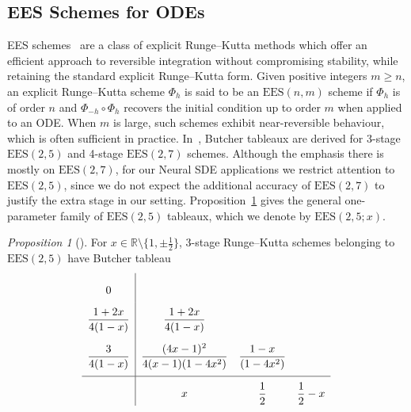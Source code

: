 \documentclass{article}
\theoremstyle{definition}
\theoremstyle{remark}
\newtheorem{proposition}{Proposition}[section]
\begin{document}

\subsection{EES Schemes for ODEs}

EES schemes~\citep{shmelev2025explicit} are a class of explicit Runge--Kutta methods which offer an efficient approach to reversible integration without compromising stability, while retaining the standard explicit Runge--Kutta form. Given positive integers $m \geq n$, an explicit Runge--Kutta scheme $\Phi_h$ is said to be an $\mathrm{EES}(n,m)$ scheme if $\Phi_h$ is of order $n$ and $\Phi_{-h} \circ \Phi_h$ recovers the initial condition up to order $m$ when applied to an ODE. When $m$ is large, such schemes exhibit near-reversible behaviour, which is often sufficient in practice. In~\cite{shmelev2025explicit}, Butcher tableaux are derived for 3-stage $\mathrm{EES}(2,5)$ and 4-stage $\mathrm{EES}(2,7)$ schemes. Although the emphasis there is mostly on $\mathrm{EES}(2,7)$, for our Neural SDE applications we restrict attention to $\mathrm{EES}(2,5)$, since we do not expect the additional accuracy of $\mathrm{EES}(2,7)$ to justify the extra stage in our setting. Proposition~\ref{prop:EES_2_5} gives the general one-parameter family of $\mathrm{EES}(2,5)$ tableaux, which we denote by $\mathrm{EES}(2,5;x)$.
\begin{proposition}[{\cite[Proposition 8.4]{shmelev2025explicit}}]
\label{prop:EES_2_5}
    For $x \in \mathbb{R} \setminus \{1,\pm \frac{1}{2}\}$, 3-stage Runge--Kutta schemes belonging to $\mathrm{EES}(2,5)$ have Butcher tableau
    \begin{equation}
    {\renewcommand{\arraystretch}{2.2}
    \begin{array}{c|ccc}
    0 &&&\\
    \displaystyle\frac{1+2x}{4(1-x)} & \displaystyle\frac{1+2x}{4(1-x)} &&\\[7pt]
    \displaystyle\frac{3}{4(1-x)} & \displaystyle\frac{(4x-1)^2}{4(x-1)(1-4x^2)} & \displaystyle\frac{1-x}{(1-4x^2)} &\\[7pt]
    \hline
    & x & \displaystyle\frac{1}{2} & \displaystyle\frac{1}{2} - x
    \end{array}
    }
    \end{equation}
\end{proposition}
\end{document}
